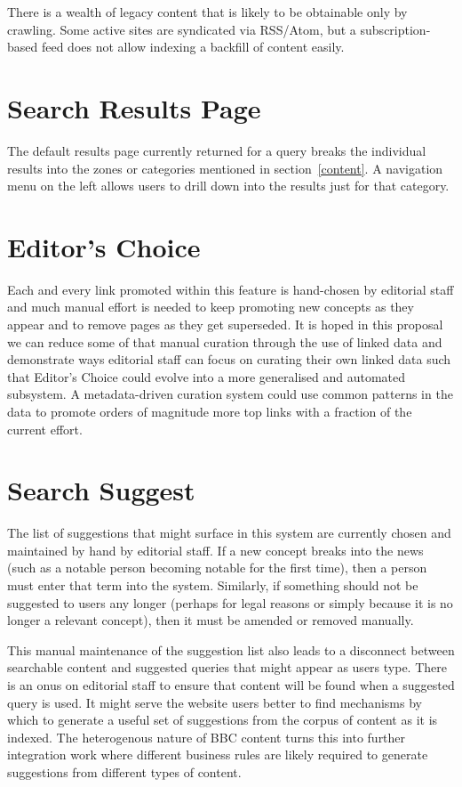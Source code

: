 There is a wealth of legacy content that is likely to be obtainable only by
crawling. Some active sites are syndicated via RSS/Atom, but a subscription-based
feed does not allow indexing a backfill of content easily.

\section{Search Results Page}

The default results page currently returned for a query breaks the individual
results into the zones or categories mentioned in section~\ref{content}. A
navigation menu on the left allows users to drill down into the results just
for that category.

\section{Editor's Choice}

Each and every link promoted within this feature is hand-chosen by editorial
staff and much manual effort is needed to keep promoting new concepts
as they appear and to remove pages as they get superseded. It is hoped
in this proposal we can reduce some of that manual curation through the use
of linked data and demonstrate ways editorial staff can focus on curating
their own linked data such that Editor's Choice could evolve into a more
generalised and automated subsystem. A metadata-driven curation system
could use common patterns in the data to promote orders of magnitude more
top links with a fraction of the current effort.


\section{Search Suggest}

The list of suggestions that might surface in this system are
currently chosen and maintained by hand by editorial staff. If a new
concept breaks into the news (such as a notable person becoming notable
for the first time), then a person must enter that term into the system.
Similarly, if something should not be suggested to users any longer
(perhaps for legal reasons or simply because it is no longer a relevant
concept), then it must be amended or removed manually.

This manual maintenance of the suggestion list also leads to a
disconnect between searchable content and suggested queries that might
appear as users type. There is an onus on editorial staff to ensure
that content will be found when a suggested query is used. It might
serve the website users better to find mechanisms by which to generate
a useful set of suggestions from the corpus of content as it is
indexed. The heterogenous nature of BBC content turns this into
further integration work where different business rules are likely required
to generate suggestions from different types of content.
